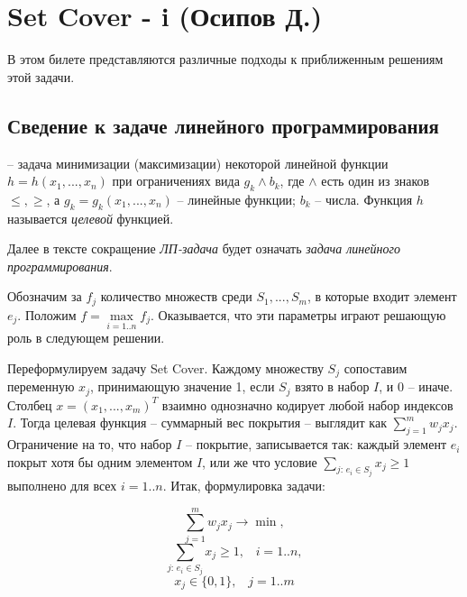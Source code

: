 \hypertarget{setcover}{\section{Set Cover - i (Осипов Д.)}}


В этом билете представляются различные подходы к приближенным решениям этой задачи. 

\subsection{Сведение к задаче линейного программирования}

 -- задача минимизации (максимизации) некоторой линейной функции $h = h(x_1, ..., x_n)$ при ограничениях вида $g_k \land b_k$, где $\land$ есть один из знаков $\leq, \geq$, а $g_k = g_k(x_1, ..., x_n)$ -- линейные функции; $b_k$ -- числа. Функция $h$ называется \textit{целевой} функцией.

Далее в тексте сокращение \textit{ЛП-задача} будет означать \textit{задача линейного программирования}.

Обозначим за $f_j$ количество множеств среди $S_1, ..., S_m$, в которые входит элемент $e_j$. Положим $f = \max\limits_{i=1..n} f_j$. Оказывается, что эти параметры играют решающую роль в следующем решении.

Переформулируем задачу Set Cover. Каждому множеству $S_j$ сопоставим переменную $x_j$, принимающую значение 1, если $S_j$ взято в набор $I$, и 0 -- иначе. Столбец $x = (x_1, ..., x_m)^T$ взаимно однозначно кодирует любой набор индексов $I$. Тогда целевая функция -- суммарный вес покрытия -- выглядит как $\sum\limits^m_{j=1} w_j x_j$. Ограничение на то, что набор $I$ -- покрытие, записывается так: каждый элемент $e_i$ покрыт хотя бы одним элементом $I$, или же что условие $\sum\limits_{j:\, e_i \in S_j} x_j \geq 1$ выполнено для всех $i=1..n$. Итак, формулировка задачи:

$$\sum^m_{j=1} w_j x_j \rightarrow \min,$$
$$\sum_{j:\, e_i \in S_j} x_j \geq 1, \;\;\; i=1..n,$$
$$x_j \in \{0, 1\}, \;\;\; j=1..m$$

